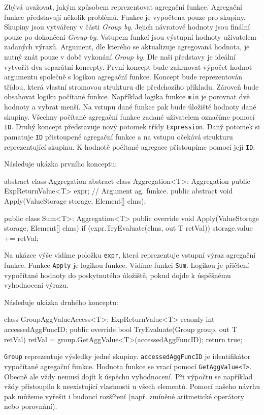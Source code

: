 Zbývá uvažovat, jakým způsobem reprezentovat agregační funkce.
Agregační funkce představují několik problémů.
Funkce je vypočtena pouze pro skupiny. 
Skupiny jsou vytvářeny v části \textit{Group by}.
Jejich návratové hodnoty jsou finální pouze po dokončení \textit{Group by}. 
Vstupem funkcí jsou výstupní hodnoty uživatelem zadaných výrazů.
Argument, dle kterého se aktualizuje agregovaná hodnota, je nutný znát pouze v době vykonání \textit{Group by}.
Dle naší představy je ideální vytvořit dva separátní koncepty.
První koncept bude zahrnovat výpočet hodnot argumentu společně s logikou agregační funkce.
Koncept bude reprezentován třídou, která vlastní stromovou strukturu dle předchozího příkladu.
Zároveň bude obsahovat logiku počítané funkce.
Například logika funkce \verb+min+ je porovnat dvě hodnoty a vybrat menší.
Na vstupu dané funkce pak bude úložiště hodnoty dané skupiny.
Všechny počítané agregační funkce zadané uživatelem označíme pomocí \verb+ID+.
Druhý koncept představuje nový potomek třídy \texttt{Expression}.
Daný potomek si pamatuje \verb+ID+ přistoupené agregační funkce a na vstupu očekává strukturu reprezentující skupinu.
K hodnotě počítané agregace přistoupíme pomocí její \verb+ID+.

Následuje ukázka prvního konceptu:
\begin{code}
abstract class Aggregation { }
abstract class Aggregation<T>: Aggregation {
  public ExpReturnValue<T> expr; // Argument ag. funkce.
  public abstract void Apply(ValueStorage storage, Element[] elms);
}
\end{code}
\begin{code}
public class Sum<T>: Aggregation<T>{
  public override void Apply(ValueStorage storage, Element[] elms) {
    if (expr.TryEvaluate(elms, out T retVal)) {
      storage.value += retVal;
    }
  }
}
\end{code}
\noindent Na ukázce výše vidíme položku \verb+expr+, která reprezentuje vstupní výraz agregační funkce.
Funkce \verb+Apply+ je logikou funkce. 
Vidíme funkci \verb+Sum+. 
Logikou je přičtení vypočítané hodnoty do poskytnutého úložiště, pokud dojde k úspěšnému vyhodnocení výrazu.

Následuje ukázka druhého konceptu:
\begin{code}
class GroupAggValueAccess<T>: ExpReturnValue<T> {
  reaonly int accessedAggFuncID; 
  public override bool TryEvaluate(Group group, out T retVal) {
    retVal = group.GetAggValue<T>(accessedAggFuncID);
    return true; }}
\end{code}
\verb+Group+ reprezentuje výsledky jedné skupiny.
\verb+accessedAggFuncID+ je identifikátor vypočítané agregační funkce.
Hodnota funkce se vrací pomocí \verb+GetAggValue<T>+.
Obecně ale vždy nemusí dojít k úspěchu vyhodnocení.
Při výpočtu se například vždy přistoupilo k neexistující vlastnosti u všech elementů.
Pomocí našeho návrhu pak můžeme vyřešit i budoucí rozšíření (např. zmíněné aritmetické operátory nebo porovnání).

